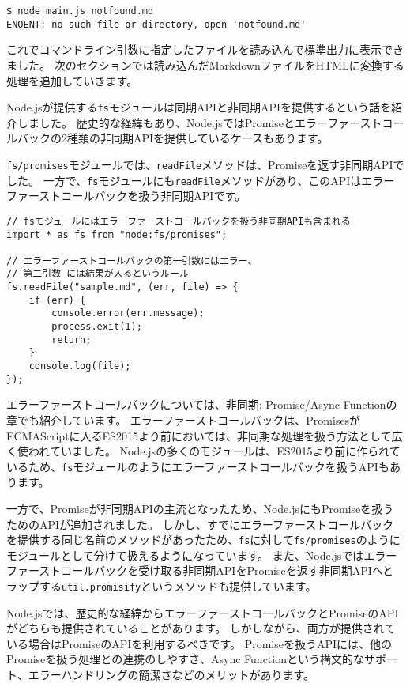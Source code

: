 \begin{lstlisting}
$ node main.js notfound.md
ENOENT: no such file or directory, open 'notfound.md'
\end{lstlisting}

これでコマンドライン引数に指定したファイルを読み込んで標準出力に表示できました。
次のセクションでは読み込んだMarkdownファイルをHTMLに変換する処理を追加していきます。

\begin{tcolorbox}[enhanced jigsaw,breakable,title=Node.jsのエラーファーストコールバック]\label{node-error-first-callbak}

Node.jsが提供する\texttt{fs}モジュールは同期APIと非同期APIを提供するという話を紹介しました。
歴史的な経緯もあり、Node.jsではPromiseとエラーファーストコールバックの2種類の非同期APIを提供しているケースもあります。

\texttt{fs/promises}モジュールでは、\texttt{readFile}メソッドは、Promiseを返す非同期APIでした。
一方で、\texttt{fs}モジュールにも\texttt{readFile}メソッドがあり、このAPIはエラーファーストコールバックを扱う非同期APIです。

\begin{lstlisting}
// fsモジュールにはエラーファーストコールバックを扱う非同期APIも含まれる
import * as fs from "node:fs/promises";

// エラーファーストコールバックの第一引数にはエラー、
// 第二引数 には結果が入るというルール
fs.readFile("sample.md", (err, file) => {
    if (err) {
        console.error(err.message);
        process.exit(1);
        return;
    }
    console.log(file);
});
\end{lstlisting}

\hyperlink{error-first-callback}{エラーファーストコールバック}については、\hyperlink{async-handling}{非同期: Promise/Async Function}の章でも紹介しています。
エラーファーストコールバックは、PromisesがECMAScriptに入るES2015より前においては、非同期な処理を扱う方法として広く使われていました。
Node.jsの多くのモジュールは、ES2015より前に作られているため、\texttt{fs}モジュールのようにエラーファーストコールバックを扱うAPIもあります。

一方で、Promiseが非同期APIの主流となったため、Node.jsにもPromiseを扱うためのAPIが追加されました。
しかし、すでにエラーファーストコールバックを提供する同じ名前のメソッドがあったため、\texttt{fs}に対して\texttt{fs/promises}のようにモジュールとして分けて扱えるようになっています。
また、Node.jsではエラーファーストコールバックを受け取る非同期APIをPromiseを返す非同期APIへとラップする\texttt{util.promisify}というメソッドも提供しています。

Node.jsでは、歴史的な経緯からエラーファーストコールバックとPromiseのAPIがどちらも提供されていることがあります。
しかしながら、両方が提供されている場合はPromiseのAPIを利用するべきです。
Promiseを扱うAPIには、他のPromiseを扱う処理との連携のしやすさ、Async Functionという構文的なサポート、エラーハンドリングの簡潔さなどのメリットがあります。
\end{tcolorbox}

